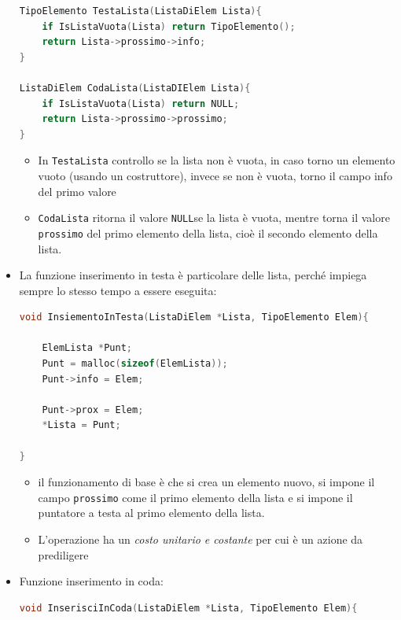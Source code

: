 \documentclass[
  paper=a4,
  oneside  ,captions=tableheading
]{scrbook}
\newcommand{\passthrough}[1]{#1}
\providecommand{\tightlist}{%
  \setlength{\itemsep}{0pt}\setlength{\parskip}{0pt}}
\begin{document}
\begin{itemize}
\begin{lstlisting}[language=C]
TipoElemento TestaLista(ListaDiElem Lista){
    if IsListaVuota(Lista) return TipoElemento();
    return Lista->prossimo->info;
}

ListaDiElem CodaLista(ListaDIElem Lista){
    if IsListaVuota(Lista) return NULL;
    return Lista->prossimo->prossimo;
}
\end{lstlisting}

  \begin{itemize}
  \tightlist
  \item
    In \passthrough{\lstinline!TestaLista!} controllo se la lista non è
    vuota, in caso torno un elemento vuoto (usando un costruttore),
    invece se non è vuota, torno il campo info del primo valore
  \item
    \passthrough{\lstinline!CodaLista!} ritorna il valore
    \passthrough{\lstinline!NULL!}se la lista è vuota, mentre torna il
    valore \passthrough{\lstinline!prossimo!} del primo elemento della
    lista, cioè il secondo elemento della lista.
  \end{itemize}
\item
  La funzione inserimento in testa è particolare delle lista, perché
  impiega sempre lo stesso tempo a essere eseguita:

\begin{lstlisting}[language=C]
void InsiementoInTesta(ListaDiElem *Lista, TipoElemento Elem){

    ElemLista *Punt;
    Punt = malloc(sizeof(ElemLista));
    Punt->info = Elem;

    Punt->prox = Elem;
    *Lista = Punt;

}
\end{lstlisting}

  \begin{itemize}
  \tightlist
  \item
    il funzionamento di base è che si crea un elemento nuovo, si impone
    il campo \passthrough{\lstinline!prossimo!} come il primo elemento
    della lista e si impone il puntatore a testa al primo elemento della
    lista.
  \item
    L'operazione ha un \emph{costo unitario e costante} per cui è un
    azione da prediligere
  \end{itemize}
\item
  Funzione inserimento in coda:

\begin{lstlisting}[language=C]
void InserisciInCoda(ListaDiElem *Lista, TipoElemento Elem){


\end{lstlisting}
\end{itemize}
\end{document}

